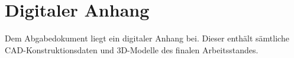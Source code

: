 \documentclass[main.tex]{subfiles} %
\begin{document}
\section{Digitaler Anhang}
Dem Abgabedokument liegt ein digitaler Anhang bei. Dieser enthält sämtliche  
CAD-Konstruktionsdaten und 3D-Modelle des finalen Arbeitsstandes.
\end{document}
